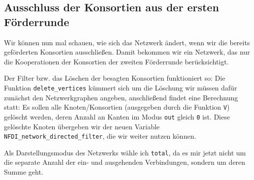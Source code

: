 \documentclass[11pt]{article}
\begin{document}
\hypertarget{ausschluss-der-konsortien-aus-der-ersten-fuxf6rderrunde}{%
\subsection{Ausschluss der Konsortien aus der ersten
Förderrunde}\label{ausschluss-der-konsortien-aus-der-ersten-fuxf6rderrunde}}

Wir können nun mal schauen, wie sich das Netzwerk ändert, wenn wir die
bereits geförderten Konsortien ausschließen. Damit bekommen wir ein
Netzwerk, das nur die Kooperationen der Konsortien der zweiten
Förderrunde berücksichtigt.

Der Filter bzw. das Löschen der besagten Konsortien funktioniert so: Die
Funktion \texttt{delete\_vertices} kümmert sich um die Löschung wir
müssen dafür zunächst den Netzwerkgraphen angeben, anschließend findet
eine Berechnung statt: Es sollen alle Knoten/Konsortien (ausgegeben
durch die Funktion \texttt{V}) gelöscht werden, deren Anzahl an Kanten
im Modus \texttt{out} gleich \texttt{0} ist. Diese gelöschte Knoten
übergeben wir der neuen Variable
\texttt{NFDI\_network\_directed\_filter}, die wir weiter nutzen können.

Als Darstellungsmodus des Netzwerks wähle ich \texttt{total}, da es mir
jetzt nicht um die separate Anzahl der ein- und ausgehenden
Verbindungen, sondern um deren Summe geht.
\end{document}
